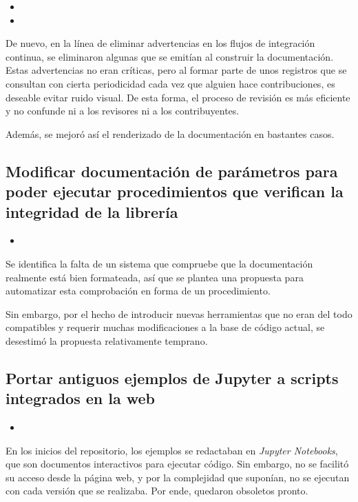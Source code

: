 \begin{itemize}
    \item {}
    \item {}
\end{itemize}

De nuevo, en la línea de eliminar advertencias en los flujos de integración continua, se eliminaron algunas que se emitían al construir la documentación. Estas advertencias no eran críticas, pero al formar parte de unos registros que se consultan con cierta periodicidad cada vez que alguien hace contribuciones, es deseable evitar ruido visual. De esta forma, el proceso de revisión es más eficiente y no confunde ni a los revisores ni a los contribuyentes.

Además, se mejoró así el renderizado de la documentación en bastantes casos.

\subsection{Modificar documentación de parámetros para poder ejecutar procedimientos que verifican la integridad de la librería}

\begin{itemize}
    \item {}
\end{itemize}

Se identifica la falta de un sistema que compruebe que la documentación realmente está bien formateada, así que se plantea una propuesta para automatizar esta comprobación en forma de un procedimiento.

Sin embargo, por el hecho de introducir nuevas herramientas que no eran del todo compatibles y requerir muchas modificaciones a la base de código actual, se desestimó la propuesta relativamente temprano.

\subsection{Portar antiguos ejemplos de Jupyter a scripts integrados en la web}

\begin{itemize}
    \item {}
\end{itemize}

En los inicios del repositorio, los ejemplos se redactaban en \textit{Jupyter Notebooks}, que son documentos interactivos para ejecutar código. Sin embargo, no se facilitó su acceso desde la página web, y por la complejidad que suponían, no se ejecutan con cada versión que se realizaba. Por ende, quedaron obsoletos pronto.

